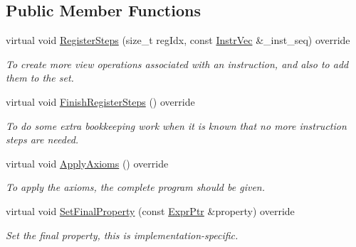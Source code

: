 \subsection*{Public Member Functions}
\begin{DoxyCompactItemize}
\item 
\mbox{\label{classilang_1_1_tso_a79354c755bdb91f4ad9a054116c4b242}} 
virtual void \mbox{\hyperlink{classilang_1_1_tso_a79354c755bdb91f4ad9a054116c4b242}{Register\+Steps}} (size\+\_\+t reg\+Idx, const \mbox{\hyperlink{classilang_1_1_memory_model_ac6cb2d9253fb53a10ea66fd1e71267bc}{Instr\+Vec}} \&\+\_\+inst\+\_\+seq) override
\begin{DoxyCompactList}\small\item\em To create more view operations associated with an instruction, and also to add them to the set. \end{DoxyCompactList}\item 
\mbox{\label{classilang_1_1_tso_a44edf79e55ba95c8b65f85285314ce1c}} 
virtual void \mbox{\hyperlink{classilang_1_1_tso_a44edf79e55ba95c8b65f85285314ce1c}{Finish\+Register\+Steps}} () override
\begin{DoxyCompactList}\small\item\em To do some extra bookkeeping work when it is known that no more instruction steps are needed. \end{DoxyCompactList}\item 
\mbox{\label{classilang_1_1_tso_a9237afb143f6b2506d9a7147bafabd66}} 
virtual void \mbox{\hyperlink{classilang_1_1_tso_a9237afb143f6b2506d9a7147bafabd66}{Apply\+Axioms}} () override
\begin{DoxyCompactList}\small\item\em To apply the axioms, the complete program should be given. \end{DoxyCompactList}\item 
\mbox{\label{classilang_1_1_tso_ac6ae9b0f23e28948362b7acdb6fae8c8}} 
virtual void \mbox{\hyperlink{classilang_1_1_tso_ac6ae9b0f23e28948362b7acdb6fae8c8}{Set\+Final\+Property}} (const \mbox{\hyperlink{namespaceilang_a7c4196c72e53ea4df4b7861af7bc3bce}{Expr\+Ptr}} \&property) override
\begin{DoxyCompactList}\small\item\em Set the final property, this is implementation-\/specific. \end{DoxyCompactList}\item 

\end{DoxyCompactItemize}
